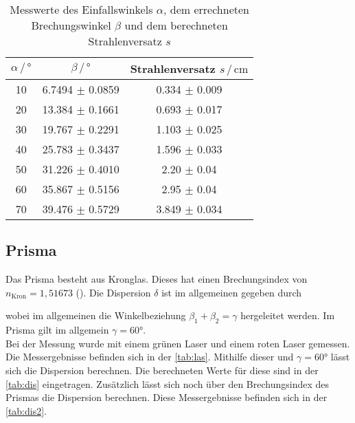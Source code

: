 \begin{table}
    \centering
    \caption{Messwerte des Einfallswinkels $\alpha$, dem errechneten Brechungswinkel $\beta$ und dem berechneten Strahlenversatz $s$}
    \label{tab:beta}
    \begin{tabular}{c c c}
    \toprule
         $\alpha \, / \, ° $ & $\beta \, / \, °$ & Strahlenversatz $s  \, / \, \si{\centi\meter}$\\
    \midrule
    10 & 6.7494 $\pm$ 0.0859  & 0.334 $\pm$ 0.009\\
    20 & 13.384 $\pm$ 0.1661  & 0.693 $\pm$ 0.017\\
    30 & 19.767 $\pm$ 0.2291  & 1.103 $\pm$ 0.025\\
    40 & 25.783 $\pm$ 0.3437  & 1.596 $\pm$ 0.033\\
    50 & 31.226 $\pm$ 0.4010  & 2.20  $\pm$ 0.04\\
    60 & 35.867 $\pm$ 0.5156  & 2.95  $\pm$ 0.04\\
    70 & 39.476 $\pm$ 0.5729  & 3.849 $\pm$ 0.034\\
    \bottomrule
    \end{tabular}
\end{table}

\subsection{Prisma}
Das Prisma besteht aus Kronglas. Dieses hat einen Brechungsindex von $n_\text{Kron} = 1,51673$ (\label{}).%
Die Dispersion $\delta$ ist im allgemeinen gegeben durch

\noindent
wobei im allgemeinen die Winkelbeziehung $\beta_1 + \beta_2 = \gamma$ hergeleitet werden. Im Prisma gilt im allgemein $\gamma = 60°$.\\

\noindent
Bei der Messung wurde mit einem grünen Laser und einem roten Laser gemessen. Die Messergebnisse befinden sich in der \autoref{tab:las}. Mithilfe dieser und $\gamma = 60°$ lässt sich die Dispersion 
berechnen. Die berechneten Werte für diese sind in der \autoref{tab:dis} eingetragen. Zusätzlich lässt sich noch über den Brechungsindex des Prismas die Dispersion berechnen. Diese Messergebnisse 
befinden sich in der \autoref{tab:dis2}.

